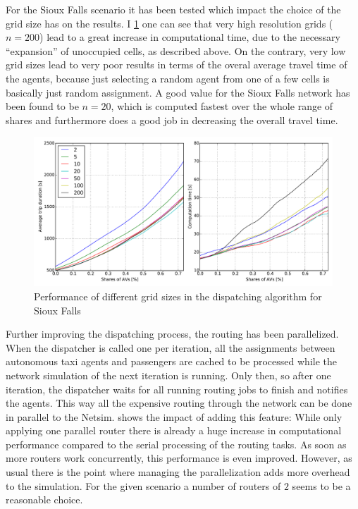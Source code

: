 
For the Sioux Falls scenario it has been tested which impact the choice of the grid
size has on the results. I \cref{fig:gridsize} one can see that very high resolution
grids ($n=200$) lead to a great increase in computational time, due to the necessary
``expansion'' of unoccupied cells, as described above. On the contrary, very low
grid sizes lead to very poor results in terms of the overal average travel time of
the agents, because just selecting a random agent from one of a few cells is basically
just random assignment. A good value for the Sioux Falls network has been found to
be $n=20$, which is computed fastest over the whole range of shares and furthermore
does a good job in decreasing the overall travel time.

\begin{figure}
    \centering
    \includegraphics[width=1.0\textwidth]{figures/gridsize.pdf}
    \caption{Performance of different grid sizes in the dispatching algorithm for Sioux Falls}
    \label{fig:gridsize}
\end{figure}

Further improving the dispatching process, the routing has been parallelized. When
the dispatcher is called one per iteration, all the assignments between autonomous
taxi agents and passengers are cached to be processed while the network simulation
of the next iteration is running. Only then, so after one iteration, the dispatcher
waits for all running routing jobs to finish and notifies the agents. This way all
the expensive routing through the network can be done in parallel to the Netsim.
 shows the impact of adding this feature: While only applying
one parallel router there is already a huge increase in computational performance
compared to the serial processing of the routing tasks. As soon as more routers
work concurrently, this performance is even improved. However, as usual there is
the point where managing the parallelization adds more overhead to the simulation.
For the given scenario a number of routers of $2$ seems to be a reasonable choice.

